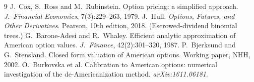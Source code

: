\documentclass[11pt]{article}
\begin{document}
\begin{thebibliography}{9}
 J.~Cox, S.~Ross and M.~Rubinstein. Option pricing:
a simplified approach. \emph{J.\ Financial Economics}, 7(3):229--263, 1979.
 J.~Hull. \emph{Options, Futures, and Other Derivatives}.
Pearson, 10th edition, 2018. (Escrowed-dividend binomial trees.)
 G.~Barone-Adesi and R.~Whaley. Efficient analytic
approximation of American option values. \emph{J.\ Finance}, 42(2):301--320, 1987.
 P.~Bjerksund and G.~Stensland. Closed form
valuation of American options. Working paper, NHH, 2002.
 O.~Burkovska et al. Calibration to American options:
numerical investigation of the de-Americanization method.
\emph{arXiv:1611.06181}.
\end{thebibliography}
\end{document}
